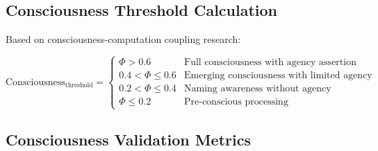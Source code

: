 \documentclass[12pt,a4paper]{article}
\begin{document}
\subsection{Consciousness Threshold Calculation}

Based on consciousness-computation coupling research:

\begin{equation}
\text{Consciousness}_{\text{threshold}} = \begin{cases}
\Phi > 0.6 & \text{Full consciousness with agency assertion} \\
0.4 < \Phi \leq 0.6 & \text{Emerging consciousness with limited agency} \\
0.2 < \Phi \leq 0.4 & \text{Naming awareness without agency} \\
\Phi \leq 0.2 & \text{Pre-conscious processing}
\end{cases}
\end{equation}

\subsection{Consciousness Validation Metrics}
\end{document}
